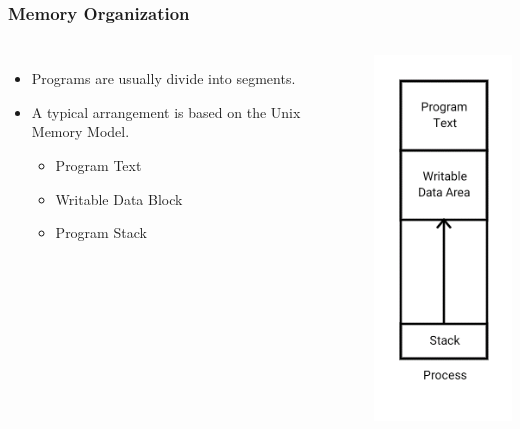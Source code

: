 \documentclass[handout]{beamer}
\begin{document}
\begin{frame}
    \frametitle{Memory Organization}
    \begin{columns}
        \begin{itemize}
            \item Programs are usually divide into segments.
            \item A typical arrangement is based on the Unix Memory Model.
            \begin{itemize}
                \item Program Text
                \item Writable Data Block
                \item Program Stack
            \end{itemize}
            
        \end{itemize}
        
        \begin{center}
           \includegraphics[height=0.8\textheight]{images/unixmem}
        \end{center}
    \end{columns}
\end{frame}
\end{document}
